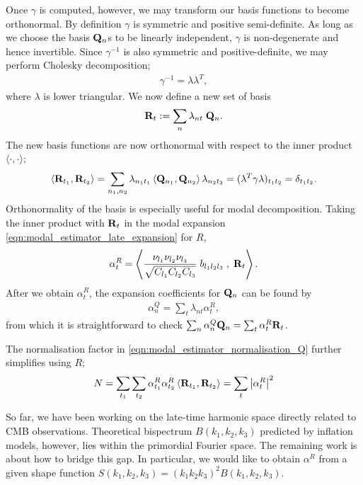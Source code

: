 Once $\gamma$ is computed, however, we may transform our basis functions to become orthonormal. By definition $\gamma$ is symmetric and positive semi-definite. As long as we choose the basis $\mathbf{Q}_n$s to be linearly independent, $\gamma$ is non-degenerate and hence invertible. Since $\gamma^{-1}$ is also symmetric and positive-definite, we may perform Cholesky decomposition;
\begin{align}
	\gamma^{-1} = \lambda \lambda^T,
\end{align}
where $\lambda$ is lower triangular. We now define a new set of basis
\begin{align}
	\mathbf{R}_t := \sum_n \lambda_{nt} \; \mathbf{Q}_{n}.
\end{align}
The new basis functions are now orthonormal with respect to the inner product $\langle \cdot,\cdot \rangle$;
\begin{align}
	\left< \mathbf{R}_{t_1} , \mathbf{R}_{t_2} \right> = \sum_{n_1,n_2} \lambda_{n_1 t_1} \left< \mathbf{Q}_{n_1} , \mathbf{Q}_{n_2} \right> \lambda_{n_2 t_2} = (\lambda^T \gamma \lambda)_{t_1 t_2} = \delta_{t_1 t_2}.
\end{align}
Orthonormality of the basis is especially useful for modal decomposition. Taking the inner product with $\mathbf{R}_t$ in the modal expansion \eqref{eqn:modal_estimator_late_expansion} for $R$,
\begin{align}
	\alpha^R_t = \left< \frac{\nu_{l_1} \nu_{l_2} \nu_{l_3}}{\sqrt{C_{l_1} C_{l_2} C_{l_3}}} \; b_{l_1 l_2 l_3} \;,\; \mathbf{R}_t \right>.
\end{align}
After we obtain $\alpha^R_t$, the expansion coefficients for $\mathbf{Q}_n$ can be found by
\begin{align}
	\alpha^Q_n = \sum_t \lambda_{nt} \alpha^R_t,
\end{align}
from which it is straightforward to check $\sum_n \alpha^Q_n \mathbf{Q}_n = \sum_t \alpha^R_t \mathbf{R}_t$.

The normalisation factor in \eqref{eqn:modal_estimator_normalisation_Q} further simplifies using $R$;
\begin{align}
	N = \sum_{t_1} \sum_{t_2} \alpha^R_{t_1} \alpha^R_{t_2} \left< \mathbf{R}_{t_1}, \mathbf{R}_{t_2} \right> = \sum_t \left| \alpha^R_{t} \right|^2 \label{eqn:modal_estimator_normalisation_R}
\end{align}

\hspace{10pt}

So far, we have been working on the late-time harmonic space directly related to CMB observations. Theoretical bispectrum $B(k_1,k_2,k_3)$ predicted by inflation models, however, lies within the primordial Fourier space. The remaining work is about how to bridge this gap. In particular, we would like to obtain $\alpha^R$ from a given shape function $S(k_1,k_2,k_3) = (k_1 k_2 k_3)^2 B(k_1, k_2, k_3)$.

